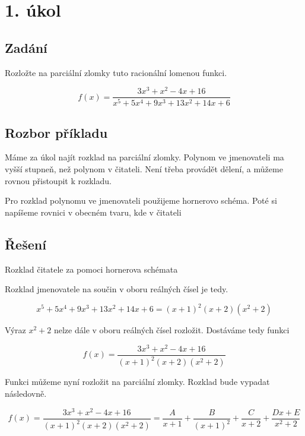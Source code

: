 \section{1. úkol}

\subsection{Zadání}
Rozložte na parciální zlomky tuto racionální lomenou funkci.

\begin{displaymath}
f(x)=\frac{3x^3+x^2-4x+16}{x^5+5x^4+9x^3+13x^2+14x+6}
\end{displaymath}

\subsection{Rozbor příkladu}
Máme za úkol najít rozklad na parciální zlomky. Polynom ve jmenovateli ma vyšší stupneň, než polynom v čitateli. Není třeba provádět dělení, a můžeme rovnou přistoupit k rozkladu.

Pro rozklad polynomu ve jmenovateli použijeme hornerovo schéma. Poté si napíšeme rovnici v obecném tvaru, kde v čitateli 

\subsection{Řešení}

\noindent Rozklad čitatele za pomoci hornerova schémata


Rozklad jmenovatele na součin v oboru reálných čísel je tedy.

\begin{displaymath}
	x^5+5x^4+9x^3+13x^2+14x+6 = (x+1)^2(x+2)(x^2+2)
\end{displaymath}

Výraz $x^2+2$ nelze dále v oboru reálných čísel rozložit. Dostáváme tedy funkci

\begin{displaymath}
f(x)=\frac{3x^3+x^2-4x+16}{(x+1)^2(x+2)(x^2+2)}
\end{displaymath}

Funkci můžeme nyní rozložit na parciální zlomky. Rozklad bude vypadat následovně.

\begin{displaymath}
f(x)=\frac{3x^3+x^2-4x+16}{(x+1)^2(x+2)(x^2+2)}
=
\frac{A}{x+1} +
\frac{B}{(x+1)^2} +
\frac{C}{x+2} +
\frac{Dx+E}{x^2+2}
\end{displaymath}


